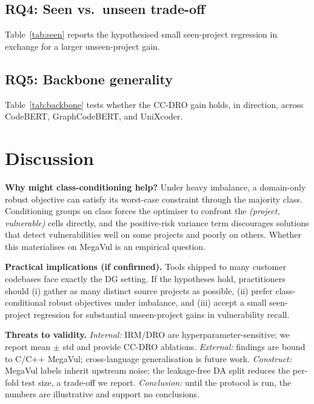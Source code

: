 \documentclass[conference]{IEEEtran}
\begin{document}
\subsection{RQ4: Seen vs.\ unseen trade-off}
Table~\ref{tab:seen} reports the hypothesised small seen-project
regression in exchange for a larger unseen-project gain.

\subsection{RQ5: Backbone generality}
Table~\ref{tab:backbone} tests whether the CC-DRO gain holds, in
direction, across CodeBERT, GraphCodeBERT, and UniXcoder.

\section{Discussion}
\noindent\textbf{Why might class-conditioning help?}
Under heavy imbalance, a domain-only robust objective can satisfy
its worst-case constraint through the majority class. Conditioning
groups on class forces the optimiser to confront the
\emph{(project, vulnerable)} cells directly, and the positive-risk
variance term discourages solutions that detect vulnerabilities
well on some projects and poorly on others. Whether this
materialises on MegaVul is an empirical question.

\noindent\textbf{Practical implications (if confirmed).}
Tools shipped to many customer codebases face exactly the DG
setting. If the hypotheses hold, practitioners should (i) gather as
many distinct source projects as possible, (ii) prefer
class-conditional robust objectives under imbalance, and (iii)
accept a small seen-project regression for substantial
unseen-project gains in vulnerability recall.

\noindent\textbf{Threats to validity.}
\emph{Internal:} IRM/DRO are hyperparameter-sensitive; we report
mean $\pm$ std and provide CC-DRO ablations. \emph{External:}
findings are bound to C/C++ MegaVul; cross-language generalisation
is future work. \emph{Construct:} MegaVul labels inherit upstream
noise; the leakage-free DA split reduces the per-fold test size, a
trade-off we report. \emph{Conclusion:} until the protocol is run,
the numbers are illustrative and support no conclusions.

\end{document}
